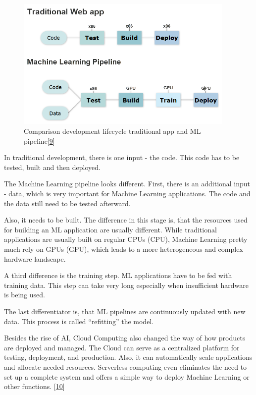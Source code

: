 \documentclass[12pt,english,a4paper,oneside,,tablecaptionabove]{scrbook}
\begin{document}
\begin{figure}
\hypertarget{fig:img}{%
\centering
\includegraphics[width=4.16667in,height=\textheight]{images/chapter1/traditional_ml_comp.png}
\caption{Comparison development lifecycle traditional app and ML
pipeline{[}\protect\hyperlink{ref-Dillon}{9}{]}}\label{fig:img}
}
\end{figure}

In traditional development, there is one input - the code. This code has
to be tested, built and then deployed.

The Machine Learning pipeline looks different. First, there is an
additional input - data, which is very important for Machine Learning
applications. The code and the data still need to be tested afterward.

Also, it needs to be built. The difference in this stage is, that the
resources used for building an ML application are usually different.
While traditional applications are usually built on regular \acs{CPU}s
(\acl{CPU}), Machine Learning pretty much rely on \acs{GPU}s
(\acl{GPU}), which leads to a more heterogeneous and complex hardware
landscape.

A third difference is the training step. ML applications have to be fed
with training data. This step can take very long especially when
insufficient hardware is being used.

The last differentiator is, that ML pipelines are continuously updated
with new data. This process is called \enquote{refitting} the model.

Besides the rise of AI, Cloud Computing also changed the way of how
products are deployed and managed. The Cloud can serve as a centralized
platform for testing, deployment, and production. Also, it can
automatically scale applications and allocate needed resources.
Serverless computing even eliminates the need to set up a complete
system and offers a simple way to deploy Machine Learning or other
functions. {[}\protect\hyperlink{ref-DavidLinthicum}{10}{]}
\end{document}

